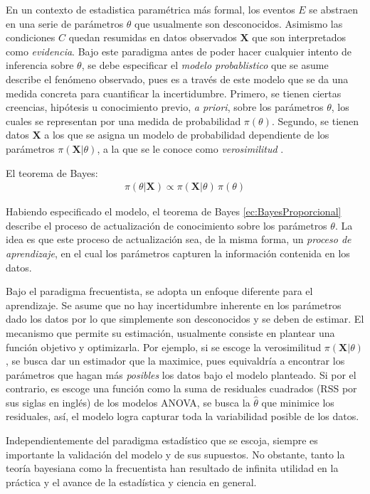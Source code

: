 \documentclass[../Main/Main.tex]{subfiles}
\begin{document}
En un contexto de estadistica paramétrica más formal, los eventos $E$ se abstraen en una serie de parámetros $\theta$ que usualmente son desconocidos. Asimismo las condiciones $C$ quedan resumidas en datos observados $\mathbf{X}$ que son interpretados como \textit{evidencia}. 
Bajo este paradigma antes de poder hacer cualquier intento de inferencia sobre $\theta$, se debe especificar el \textit{modelo probablistico} que se asume describe el fenómeno observado, pues es a través de este modelo que se da una medida concreta para cuantificar la incertidumbre. Primero, se tienen ciertas creencias, hipótesis u conocimiento previo, \textit{a priori}, sobre los parámetros $\theta$, los cuales se representan por una medida de probabilidad $\pi(\theta)$. Segundo, se tienen datos $\mathbf{X}$ a los que se asigna un modelo de probabilidad dependiente de los parámetros $\pi(\mathbf{X}|\theta)$, a la que se le conoce como \textit{verosimilitud} \autocite{bernardo2003bayesian}.
\begin{theorem}
El teorema de Bayes:
\begin{align} 
	\pi(\theta|\mathbf{X}) \propto \pi(\mathbf{X}|\theta)\,\pi(\theta)\label{ec:BayesProporcional}
\end{align}
\end{theorem}
Habiendo especificado el modelo, el teorema de Bayes \eqref{ec:BayesProporcional} describe el proceso de actualización de conocimiento sobre los parámetros $\theta$. La idea es que este proceso de actualización sea, de la misma forma, un \textit{proceso de aprendizaje}, en el cual los parámetros capturen la información contenida en los datos.

Bajo el paradigma frecuentista, se adopta un enfoque diferente para el  aprendizaje. Se asume que no hay incertidumbre inherente en los parámetros dado los datos por lo que simplemente son desconocidos y se deben de estimar. El mecanismo que permite su estimación, usualmente consiste en plantear una función objetivo y optimizarla. Por ejemplo, si se escoge la verosimilitud $\pi(\mathbf{X}|\theta)$, se busca dar un estimador que la maximice, pues equivaldría a encontrar los parámetros que hagan más \textit{posibles} los datos bajo el modelo planteado. Si por el contrario, es escoge una función como la suma de residuales cuadrados (RSS por sus siglas en inglés) de los modelos ANOVA, se busca la $\hat{\theta}$ que minimice los residuales, así, el modelo logra capturar toda la variabilidad posible de los datos. 

Independientemente del paradigma estadístico que se escoja, siempre es importante la validación del modelo y de sus supuestos. No obstante, tanto la teoría bayesiana como la frecuentista han resultado de infinita utilidad en la práctica y el avance de la estadística y ciencia en general.
\end{document}
